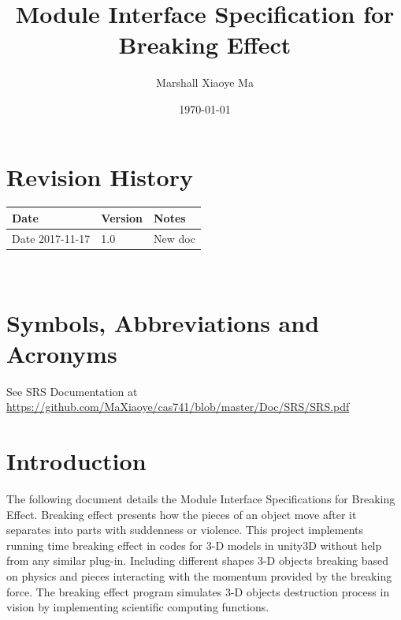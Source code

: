 \documentclass[12pt, titlepage]{article}
\begin{document}
\title{Module Interface Specification for Breaking Effect}

\author{Marshall Xiaoye Ma}

\date{\today}

\maketitle


\section{Revision History}

\begin{tabularx}{\textwidth}{p{3cm}p{2cm}X}
\toprule {\bf Date} & {\bf Version} & {\bf Notes}\\
\midrule
Date 2017-11-17 & 1.0 & New doc\\
\bottomrule
\end{tabularx}

~\newpage

\section{Symbols, Abbreviations and Acronyms}

See SRS Documentation at \url{https://github.com/MaXiaoye/cas741/blob/master/Doc/SRS/SRS.pdf}

\newpage

\tableofcontents

\newpage


\section{Introduction}

The following document details the Module Interface Specifications for Breaking Effect. 
Breaking effect presents how the pieces of an object move after it separates into parts with
suddenness or violence.
This project implements running time breaking effect in codes for 3-D models in unity3D without help from any similar plug-in. Including different shapes 3-D objects breaking based on physics and pieces interacting with the momentum provided by the breaking force. The breaking effect program simulates 3-D objects destruction process in vision by implementing scientific computing functions.
\end{document}
